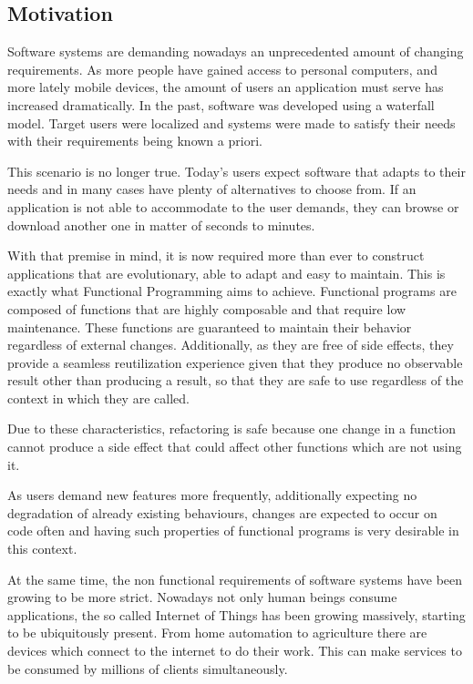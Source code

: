\documentclass[../main.tex]{subfiles}
\begin{document}
\subsection{Motivation}
Software systems are demanding nowadays an unprecedented amount of changing
requirements. As more people have gained access to personal computers, and more
lately mobile devices, the amount of users an application must serve has
increased dramatically. In the past, software was developed using a waterfall model.
Target users were localized and systems were made to satisfy their needs with
their requirements being known a priori.

This scenario is no longer true. Today's users expect software that adapts to their
needs and in many cases have plenty of alternatives to choose from. If an application
is not able to accommodate to the user demands, they can browse or
download another one in matter of seconds to minutes.

With that premise in mind, it is now required more than ever to construct applications that are
evolutionary, able to adapt and easy to maintain. This is exactly what
Functional Programming aims to achieve. Functional programs are composed of
functions that are highly composable and that require low maintenance. These
functions are guaranteed to maintain their behavior regardless of external
changes. Additionally, as they are free of side effects, they provide a seamless
reutilization experience given that they produce no observable result other than
producing a result, so that they are safe to use regardless of the context in which
they are called.

Due to these characteristics, refactoring is safe because one change in a function
cannot produce a side effect that could affect other functions which are not using
it.

As users demand new features more frequently, additionally expecting no degradation of already
existing behaviours, changes are expected to occur on code often and having such
properties of functional programs is very desirable in this context.

At the same time, the non functional requirements of software systems have been
growing to be more strict. Nowadays not only human beings consume applications,
the so called Internet of Things has been growing massively, starting to be
ubiquitously present. From home automation to agriculture there are devices
which connect to the internet to do their work. This can make services to be
consumed by millions of clients simultaneously.
\end{document}
